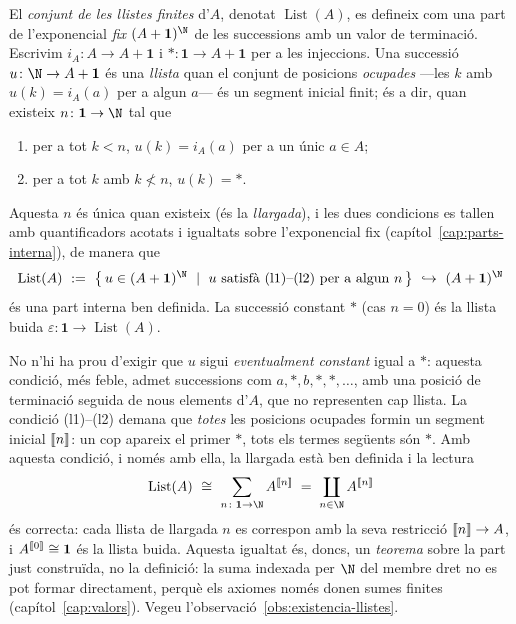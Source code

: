\begin{definicio}\label{def:llistes}
El \emph{conjunt de les llistes finites} d'\(A\), denotat
\(\operatorname{List}(A)\), es defineix com una part de l'exponencial
\emph{fix} \((A+\mathbf1)^{\N}\) de les successions amb un valor de
terminació. Escrivim \(i_A\colon A\to A+\mathbf1\) i
\(\ast\colon\mathbf1\to A+\mathbf1\) per a les injeccions. Una successió
\(u\colon\N\to A+\mathbf1\) és una \emph{llista} quan el conjunt de
posicions \emph{ocupades} ---les \(k\) amb \(u(k)=i_A(a)\) per a algun
\(a\)--- és un segment inicial finit; és a dir, quan existeix
\(n\colon\mathbf1\to\N\) tal que
\begin{enumerate}
\item[(l1)] per a tot \(k<n\), \(u(k)=i_A(a)\) per a un únic \(a\in A\);
\item[(l2)] per a tot \(k\) amb \(k\not<n\), \(u(k)=\ast\).
\end{enumerate}
Aquesta \(n\) és única quan existeix (és la \emph{llargada}), i les dues
condicions es tallen amb quantificadors acotats i igualtats sobre
l'exponencial fix (capítol~\ref{cap:parts-interna}), de manera que
\[
\operatorname{List}(A)\ :=\ \bigl\{\,u\in(A+\mathbf1)^{\N}\ \mid\ u\text{
satisfà (l1)--(l2) per a algun }n\,\bigr\}\ \hookrightarrow\
(A+\mathbf1)^{\N}
\]
és una part interna ben definida. La successió constant \(\ast\)
(cas \(n=0\)) és la llista buida
\(\varepsilon\colon\mathbf1\to\operatorname{List}(A)\).
\end{definicio}

\begin{observacio}\label{obs:llistes-segment}
No n'hi ha prou d'exigir que \(u\) sigui \emph{eventualment constant} igual
a \(\ast\): aquesta condició, més feble, admet successions com
\(a,\ast,b,\ast,\ast,\dots\), amb una posició de terminació seguida de nous
elements d'\(A\), que no representen cap llista. La condició (l1)--(l2)
demana que \emph{totes} les posicions ocupades formin un segment inicial
\(\llbracket n\rrbracket\): un cop apareix el primer \(\ast\), tots els termes següents
són \(\ast\). Amb aquesta condició, i només amb ella, la llargada està ben
definida i la lectura
\[
\operatorname{List}(A)\ \cong\ \sum_{n\colon\mathbf1\to\N}A^{\seg{n}}
\;=\;\coprod_{n\in\N}A^{\seg{n}}
\]
és correcta: cada llista de llargada \(n\) es correspon amb la seva
restricció \(\llbracket n\rrbracket\to A\), i \(A^{\llbracket 0\rrbracket}\cong\mathbf1\) és la llista
buida. Aquesta igualtat és, doncs, un \emph{teorema} sobre la part just
construïda, no la definició: la suma indexada per \(\N\) del membre dret no
es pot formar directament, perquè els axiomes només donen sumes finites
(capítol~\ref{cap:valors}). Vegeu l'observació~\ref{obs:existencia-llistes}.
\end{observacio}

